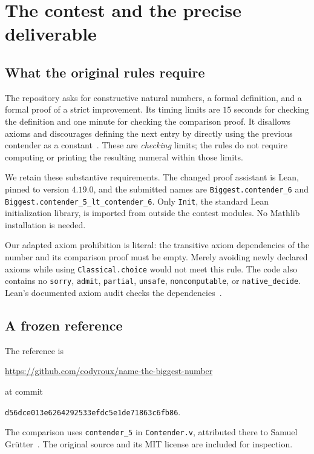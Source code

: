 \documentclass[11pt,letterpaper]{article}
\theoremstyle{definition}
\newcommand{\code}[1]{\texttt{#1}}
\begin{document}
\section{The contest and the precise deliverable}
\subsection{What the original rules require}
The repository asks for constructive natural numbers, a formal definition,
and a formal proof of a strict improvement. Its timing limits are \(15\)
seconds for checking the definition and one minute for checking the comparison
proof. It disallows axioms and discourages defining the next entry by directly
using the previous contender as a constant~\cite{contest-rules}.
These are \emph{checking} limits; the rules do not require computing or printing
the resulting numeral within those limits.

We retain these substantive requirements. The changed proof assistant is
Lean, pinned to version \(4.19.0\), and the submitted names are
\code{Biggest.contender\_6} and
\code{Biggest.contender\_5\_lt\_contender\_6}. Only \code{Init}, the standard
Lean initialization library, is imported from outside the contest modules.
No Mathlib installation is needed.

Our adapted axiom prohibition is literal: the transitive axiom dependencies
of the number and its comparison proof must be empty. Merely avoiding newly
declared axioms while using \code{Classical.choice} would not meet this rule.
The code also contains no \code{sorry}, \code{admit}, \code{partial},
\code{unsafe}, \code{noncomputable}, or \code{native\_decide}.
Lean's documented axiom audit checks the dependencies~\cite{lean-axioms}.

\subsection{A frozen reference}
The reference is
\begin{center}
\url{https://github.com/codyroux/name-the-biggest-number}
\end{center}
at commit
\begin{center}
\small\texttt{d56dce013e6264292533efdc5e1de71863c6fb86}.
\end{center}
The comparison uses \code{contender\_5} in \code{Contender.v}, attributed
there to Samuel Gr\"utter~\cite{contender-source}. The original source
and its MIT license are included for inspection.
\end{document}
